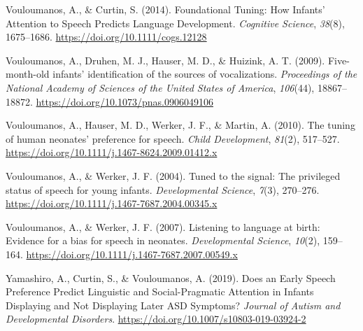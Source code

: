 \documentclass[
  english,
  man]{apa6}
\begin{document}
\leavevmode\hypertarget{ref-vouloumanos_foundational_2014}{}%
Vouloumanos, A., \& Curtin, S. (2014). Foundational Tuning: How Infants' Attention to Speech Predicts Language Development. \emph{Cognitive Science}, \emph{38}(8), 1675--1686. \url{https://doi.org/10.1111/cogs.12128}

\leavevmode\hypertarget{ref-vouloumanos_five-month-old_2009}{}%
Vouloumanos, A., Druhen, M. J., Hauser, M. D., \& Huizink, A. T. (2009). Five-month-old infants' identification of the sources of vocalizations. \emph{Proceedings of the National Academy of Sciences of the United States of America}, \emph{106}(44), 18867--18872. \url{https://doi.org/10.1073/pnas.0906049106}

\leavevmode\hypertarget{ref-vouloumanos_tuning_2010}{}%
Vouloumanos, A., Hauser, M. D., Werker, J. F., \& Martin, A. (2010). The tuning of human neonates' preference for speech. \emph{Child Development}, \emph{81}(2), 517--527. \url{https://doi.org/10.1111/j.1467-8624.2009.01412.x}

\leavevmode\hypertarget{ref-vouloumanos_tuned_2004}{}%
Vouloumanos, A., \& Werker, J. F. (2004). Tuned to the signal: The privileged status of speech for young infants. \emph{Developmental Science}, \emph{7}(3), 270--276. \url{https://doi.org/10.1111/j.1467-7687.2004.00345.x}

\leavevmode\hypertarget{ref-vouloumanos_listening_2007}{}%
Vouloumanos, A., \& Werker, J. F. (2007). Listening to language at birth: Evidence for a bias for speech in neonates. \emph{Developmental Science}, \emph{10}(2), 159--164. \url{https://doi.org/10.1111/j.1467-7687.2007.00549.x}

\leavevmode\hypertarget{ref-yamashiro_does_2019}{}%
Yamashiro, A., Curtin, S., \& Vouloumanos, A. (2019). Does an Early Speech Preference Predict Linguistic and Social-Pragmatic Attention in Infants Displaying and Not Displaying Later ASD Symptoms? \emph{Journal of Autism and Developmental Disorders}. \url{https://doi.org/10.1007/s10803-019-03924-2}

\endgroup
\end{document}

